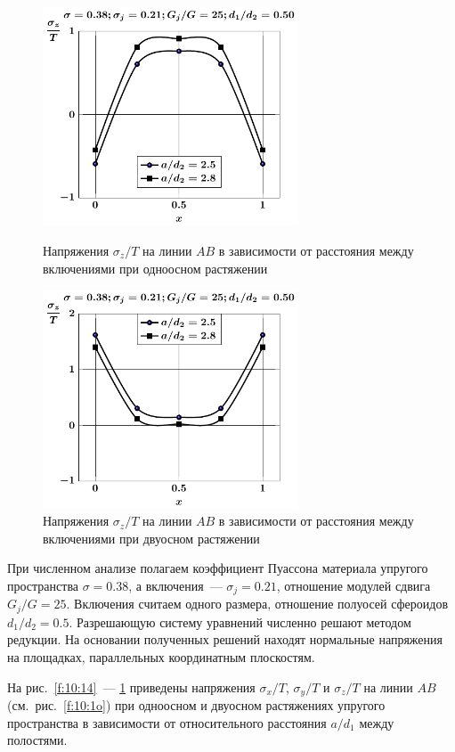 \begin{figure}[h!]
\centering\footnotesize
\parbox[b]{7.5cm}{\centering\includegraphics[width=7.6cm]{oblate-inc8-a-d50-g25-t1-sig_z.pdf}
\caption{Напряжения $\sigma_z/T$ на линии $AB$ в зависимости от расстояния между включениями при одноосном растяжении
\label{f:10:18}}}\hfil\hfil
\parbox[b]{7.5cm}{\centering\includegraphics[width=7.6cm]{oblate-inc8-a-d50-g25-t2-sig_z.pdf}
\caption{Напряжения $\sigma_z/T$ на линии $AB$ в зависимости от расстояния между включениями при двуосном растяжении
\label{f:10:19}}}
\end{figure}

При численном анализе полагаем коэффициент Пуассона материала упругого пространства $\sigma=0.38$, а включения~--- $\sigma_j=0.21$, отношение модулей сдвига $G_j/G=25$. Включения считаем одного размера, отношение полуосей сфероидов $d_1/d_2=0.5$. Разрешающую систему уравнений численно решают методом редукции. На основании полученных решений находят нормальные напряжения на площадках, параллельных координатным плоскостям.

На рис.~\ref{f:10:14}~--- \ref{f:10:19} приведены напряжения $\sigma_x/T$, $\sigma_y/T$ и $\sigma_z/T$ на линии $AB$ (см.~рис.~\ref{f:10:1o}) при одноосном и двуосном растяжениях упругого пространства в зависимости от относительного расстояния $a/d_1$ между полостями.